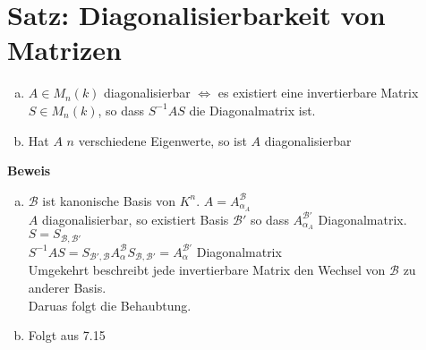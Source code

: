 \section{Satz: Diagonalisierbarkeit von Matrizen}
	\begin{enumerate}[a)]
		\item $A\in M_n(k)$ diagonalisierbar $\Leftrightarrow$ es existiert eine invertierbare Matrix $S\in M_n(k)$, so dass $S^{-1}AS$ die Diagonalmatrix ist.
		\item Hat $A$ $n$ verschiedene Eigenwerte, so ist $A$ diagonalisierbar
	\end{enumerate}
	\textbf{Beweis}
	\begin{enumerate}[a)]
		\item $\mathcal{B}$ ist kanonische Basis von $K^n$. $A=A_{\alpha_A}^{\mathcal{B}}$\\
			$A$ diagonalisierbar, so existiert Basis $\mathcal{B}'$ so dass $A_{\alpha_A}^{\mathcal{B}'}$ Diagonalmatrix.\\
			$S=S_{\mathcal{B},\mathcal{B}'}$\\
			$S^{-1}AS=S_{\mathcal{B}',\mathcal{B}}A_\alpha^\mathcal{B}S_{\mathcal{B},\mathcal{B'}}=A_\alpha^{\mathcal{B}'}$ Diagonalmatrix\\
			Umgekehrt beschreibt jede invertierbare Matrix den Wechsel von $\mathcal{B}$ zu anderer Basis.\\
			Daruas folgt die Behaubtung.
		\item Folgt aus 7.15
	\end{enumerate}
